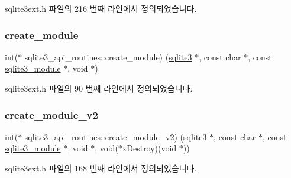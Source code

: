 sqlite3ext.\+h 파일의 216 번째 라인에서 정의되었습니다.

\mbox{\label{structsqlite3__api__routines_a0d2bee02b4c2ce95aa3ae6d4b904bff6}} 
\subsubsection{\texorpdfstring{create\+\_\+module}{create\_module}}
{\footnotesize\ttfamily int($\ast$ sqlite3\+\_\+api\+\_\+routines\+::create\+\_\+module) (\hyperlink{sqlite3_8h_a0ef6f2646262c8a9b24368d8ac140f69}{sqlite3} $\ast$, const char $\ast$, const \hyperlink{structsqlite3__module}{sqlite3\+\_\+module} $\ast$, void $\ast$)}



sqlite3ext.\+h 파일의 90 번째 라인에서 정의되었습니다.

\mbox{\label{structsqlite3__api__routines_aa460b2835f8b644e463842963b98f707}} 
\subsubsection{\texorpdfstring{create\+\_\+module\+\_\+v2}{create\_module\_v2}}
{\footnotesize\ttfamily int($\ast$ sqlite3\+\_\+api\+\_\+routines\+::create\+\_\+module\+\_\+v2) (\hyperlink{sqlite3_8h_a0ef6f2646262c8a9b24368d8ac140f69}{sqlite3} $\ast$, const char $\ast$, const \hyperlink{structsqlite3__module}{sqlite3\+\_\+module} $\ast$, void $\ast$, void($\ast$x\+Destroy)(void $\ast$))}



sqlite3ext.\+h 파일의 168 번째 라인에서 정의되었습니다.

\mbox{\label{structsqlite3__api__routines_a4d248c8b990dc7b96c5734ec878508a0}} 
